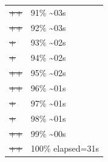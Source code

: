 \documentclass[12pt]{article}
\begin{document}
\begin{center}
\begin{tabular}{ll}
\sout{\sout{\sout{\sout{\sout{\sout{\sout{\sout{\sout{\sout{\sout{\sout{\sout{\sout{\sout{\sout{\sout{\sout{\sout{\sout{\sout{\sout{++}}}}}}}}}}}}}}}}}}}}}} & 91\% \textasciitilde{}03s\\
\sout{\sout{\sout{\sout{\sout{\sout{\sout{\sout{\sout{\sout{\sout{\sout{\sout{\sout{\sout{\sout{\sout{\sout{\sout{\sout{\sout{\sout{++}}}}}}}}}}}}}}}}}}}}}} & 92\% \textasciitilde{}03s\\
\sout{\sout{\sout{\sout{\sout{\sout{\sout{\sout{\sout{\sout{\sout{\sout{\sout{\sout{\sout{\sout{\sout{\sout{\sout{\sout{\sout{\sout{\sout{+}}}}}}}}}}}}}}}}}}}}}}} & 93\% \textasciitilde{}02s\\
\sout{\sout{\sout{\sout{\sout{\sout{\sout{\sout{\sout{\sout{\sout{\sout{\sout{\sout{\sout{\sout{\sout{\sout{\sout{\sout{\sout{\sout{\sout{+}}}}}}}}}}}}}}}}}}}}}}} & 94\% \textasciitilde{}02s\\
\sout{\sout{\sout{\sout{\sout{\sout{\sout{\sout{\sout{\sout{\sout{\sout{\sout{\sout{\sout{\sout{\sout{\sout{\sout{\sout{\sout{\sout{\sout{++}}}}}}}}}}}}}}}}}}}}}}} & 95\% \textasciitilde{}02s\\
\sout{\sout{\sout{\sout{\sout{\sout{\sout{\sout{\sout{\sout{\sout{\sout{\sout{\sout{\sout{\sout{\sout{\sout{\sout{\sout{\sout{\sout{\sout{++}}}}}}}}}}}}}}}}}}}}}}} & 96\% \textasciitilde{}01s\\
\sout{\sout{\sout{\sout{\sout{\sout{\sout{\sout{\sout{\sout{\sout{\sout{\sout{\sout{\sout{\sout{\sout{\sout{\sout{\sout{\sout{\sout{\sout{\sout{+}}}}}}}}}}}}}}}}}}}}}}}} & 97\% \textasciitilde{}01s\\
\sout{\sout{\sout{\sout{\sout{\sout{\sout{\sout{\sout{\sout{\sout{\sout{\sout{\sout{\sout{\sout{\sout{\sout{\sout{\sout{\sout{\sout{\sout{\sout{+}}}}}}}}}}}}}}}}}}}}}}}} & 98\% \textasciitilde{}01s\\
\sout{\sout{\sout{\sout{\sout{\sout{\sout{\sout{\sout{\sout{\sout{\sout{\sout{\sout{\sout{\sout{\sout{\sout{\sout{\sout{\sout{\sout{\sout{\sout{++}}}}}}}}}}}}}}}}}}}}}}}} & 99\% \textasciitilde{}00s\\
\sout{\sout{\sout{\sout{\sout{\sout{\sout{\sout{\sout{\sout{\sout{\sout{\sout{\sout{\sout{\sout{\sout{\sout{\sout{\sout{\sout{\sout{\sout{\sout{++}}}}}}}}}}}}}}}}}}}}}}}} & 100\% elapsed=31s\\
\end{tabular}
\end{center}
\begin{verbatim}

\end{verbatim}
\end{document}
